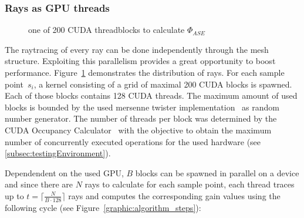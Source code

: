 \subsubsection{Rays as GPU threads}
\label{subsubsec:rays}
\begin{figure}[H]
  \centerline
  {}
  \caption{one of 200 CUDA threadblocks to calculate $\Phi_{ASE}$}
  \label{graphic:kernel}
\end{figure}
    The raytracing of every ray can be done independently through the mesh
    structure.  Exploiting this parallelism provides a great opportunity to
    boost performance. Figure~\ref{graphic:kernel} demonstrates the distribution
    of rays. For each sample point~$s_i$, a kernel consisting of a grid of 
    maximal 200 CUDA blocks is spawned. Each of those blocks contains 128 CUDA threads.
    The maximum amount of used blocks is bounded by the used
    mersenne twister implementation~\cite{mersenne_twister} as random number generator.
    The number of threads per block was determined by the CUDA Occupancy 
    Calculator~\cite{occupancy_calculator} with the objective to obtain the
    maximum number of concurrently executed operations for the used hardware
    (see \cref{subsec:testingEnvironment}).
    
    Dependendent on the used GPU, $B$ blocks can be spawned
    in parallel on a device and since there are $N$ rays to calculate for each sample point, each thread
    traces up to $t = \lceil\frac {N}{B\cdot128}\rceil$ rays and computes the
    corresponding gain values using the following cycle (see Figure~\ref{graphic:algorithm_steps}):
    
